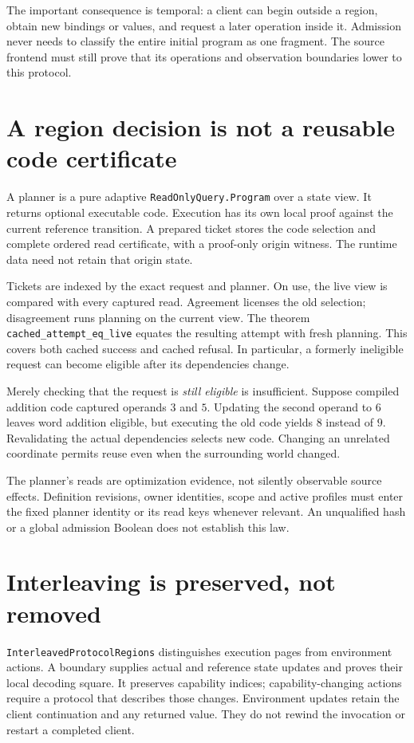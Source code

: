 \documentclass[11pt,a4paper]{article}
\newcommand{\code}[1]{\nolinkurl{#1}}
\begin{document}
The important consequence is temporal: a client can begin outside a region,
obtain new bindings or values, and request a later operation inside it.
Admission never needs to classify the entire initial program as one fragment.
The source frontend must still prove that its operations and observation
boundaries lower to this protocol.

\section{A region decision is not a reusable code certificate}

A planner is a pure adaptive \code{ReadOnlyQuery.Program} over a state view.
It returns optional executable code. Execution has its own local proof
against the current reference transition. A prepared ticket stores the code
selection and complete ordered read certificate, with a proof-only origin
witness. The runtime data need not retain that origin state.

Tickets are indexed by the exact request and planner. On use, the live view
is compared with every captured read. Agreement licenses the old selection;
disagreement runs planning on the current view. The theorem
\code{cached_attempt_eq_live} equates the resulting attempt with fresh planning.
This covers both cached success and cached refusal. In particular, a formerly
ineligible request can become eligible after its dependencies change.

Merely checking that the request is \emph{still eligible} is insufficient.
Suppose compiled addition code captured operands $3$ and $5$. Updating the
second operand to $6$ leaves word addition eligible, but executing the old
code yields $8$ instead of $9$. Revalidating the actual dependencies selects
new code. Changing an unrelated coordinate permits reuse even when the
surrounding world changed.

The planner's reads are optimization evidence, not silently observable source
effects. Definition revisions, owner identities, scope and active profiles
must enter the fixed planner identity or its read keys whenever relevant.
An unqualified hash or a global admission Boolean does not establish this law.

\section{Interleaving is preserved, not removed}

\code{InterleavedProtocolRegions} distinguishes execution pages from
environment actions. A boundary supplies actual and reference state updates
and proves their local decoding square. It preserves capability indices;
capability-changing actions require a protocol that describes those changes.
Environment updates retain the client continuation and any returned value.
They do not rewind the invocation or restart a completed client.
\end{document}
